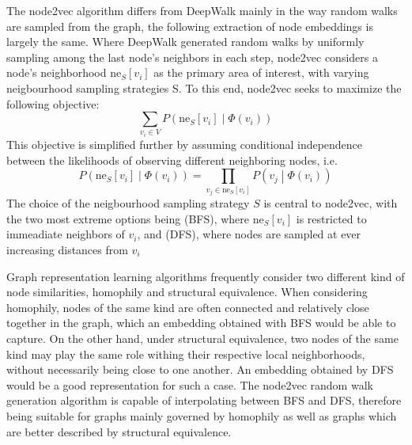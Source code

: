 The node2vec algorithm differs from DeepWalk mainly in the way random walks are sampled from the graph, the following extraction of node embeddings is largely the same. Where DeepWalk generated random walks by uniformly sampling among the last node's neighbors in each step, node2vec considers a node's neighborhood \( \mathrm{ne}_S [ v_i ] \) as the primary area of interest, with varying neigbourhood sampling strategies S. To this end, node2vec seeks to maximize the following objective:
\begin{equation}\label{eq:node2vec-objective}
	\sum_{v_i \in V} P \left( \mathrm{ne}_S[v_i] \middle| \Phi \left( v_i \right) \right)
\end{equation}
This objective is simplified further by assuming conditional independence between the likelihoods of observing different neighboring nodes, i.e.
\begin{equation}
	P \left( \mathrm{ne}_S[v_i] \middle| \Phi \left( v_i \right) \right) = \prod_{v_j \in \mathrm{ne}_S[v_i]} P \left( v_j \middle| \Phi \left( v_i \right) \right)
\end{equation}
The choice of the neigbourhood sampling strategy \( S \) is central to node2vec, with the two most extreme options being  (BFS), where \( \mathrm{ne}_S [ v_i ] \) is restricted to immeadiate neighbors of \( v_i \), and  (DFS), where nodes are sampled at ever increasing distances from \( v_i \)

Graph representation learning algorithms frequently consider two different kind of node similarities, homophily and structural equivalence. When considering homophily, nodes of the same kind are often connected and relatively close together in the graph, which an embedding obtained with BFS would be able to capture. On the other hand, under structural equivalence, two nodes of the same kind may play the same role withing their respective local neighborhoods, without necessarily being close to one another. An embedding obtained by DFS would be a good representation for such a case. The node2vec random walk generation algorithm is capable of interpolating between BFS and DFS, therefore being suitable for graphs mainly governed by homophily as well as graphs which are better described by structural equivalence.

